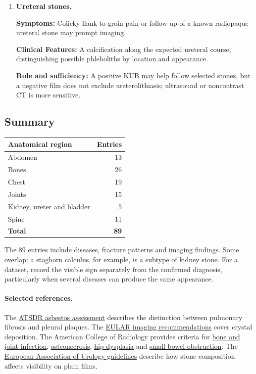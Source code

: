 \begin{enumerate}[leftmargin=*,itemsep=0.45em,topsep=0.4em]
\item \textbf{Ureteral stones.}\par\noindent\textbf{Symptoms:} Colicky flank-to-groin pain or follow-up of a known radiopaque ureteral stone may prompt imaging.\par\noindent\textbf{Clinical Features:} A calcification along the expected ureteral course, distinguishing possible phleboliths by location and appearance.\par\noindent\textbf{Role and sufficiency:} A positive KUB may help follow selected stones, but a negative film does not exclude ureterolithiasis; ultrasound or noncontrast CT is more sensitive.
\end{enumerate}

\subsection{Summary}
\begin{center}
\begin{tabular}{@{}lr@{}}
\toprule
\textbf{Anatomical region} & \textbf{Entries} \\
\midrule
Abdomen & 13 \\
Bones & 26 \\
Chest & 19 \\
Joints & 15 \\
Kidney, ureter and bladder & 5 \\
Spine & 11 \\
\midrule
\midrule
\textbf{Total} & \textbf{89} \\
\bottomrule
\end{tabular}
\end{center}

The 89 entries include diseases, fracture patterns and imaging findings. Some overlap: a staghorn calculus, for example, is a subtype of kidney stone. For a dataset, record the visible sign separately from the confirmed diagnosis, particularly when several diseases can produce the same appearance.

\paragraph{Selected references.}
The \href{https://archive.cdc.gov/www_atsdr_cdc_gov/csem/asbestos/clinical_assessment-tests.html}{ATSDR asbestos assessment} describes the distinction between pulmonary fibrosis and pleural plaques.
The \href{https://ard.bmj.com/content/83/6/752}{EULAR imaging recommendations} cover crystal deposition.
The American College of Radiology provides criteria for \href{https://acsearch.acr.org/docs/3094201/Narrative/}{bone and joint infection},
\href{https://acsearch.acr.org/docs/69420/Narrative/}{osteonecrosis},
\href{https://acsearch.acr.org/docs/69437/Narrative/}{hip dysplasia} and
\href{https://acsearch.acr.org/docs/69476/Narrative/}{small bowel obstruction}.
The \href{https://uroweb.org/guidelines/urolithiasis/chapter/guidelines}{European Association of Urology guidelines} describe how stone composition affects visibility on plain films.
